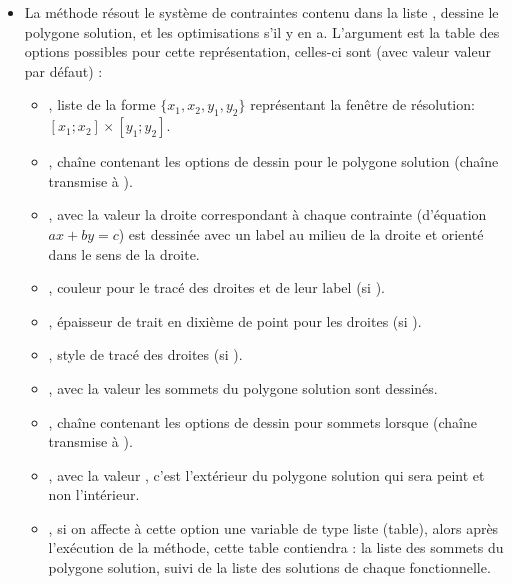 \begin{itemize}
    \item La méthode  résout le système de contraintes contenu dans la liste , dessine le polygone solution, et les optimisations s'il y en a. L'argument  est la table des options possibles pour cette représentation, celles-ci sont (avec valeur valeur par défaut) :
    \begin{itemize}
        \item {}, liste de la forme $\{x_1,x_2,y_1,y_2\}$ représentant la fenêtre de résolution: $[x_1;x_2]\times[y_1;y_2]$.
        
        \item {}, chaîne contenant les options de dessin pour le polygone solution (chaîne transmise à \drawcmd).
        
        \item {}, avec la valeur \true la droite correspondant à chaque contrainte (d'équation $ax+by=c$) est dessinée avec un label au milieu de la droite et orienté dans le sens de la droite.
        
        \item {}, couleur pour le tracé des droites et de leur label (si ).

        \item {}, épaisseur de trait en dixième de point pour les droites (si ).

        \item {}, style de tracé des droites (si ).
        
        \item {}, avec la valeur \true les sommets du polygone solution sont dessinés.
        
        \item {}, chaîne contenant les options de dessin pour sommets lorsque  (chaîne transmise à \drawcmd).
        
        \item {}, avec la valeur \true, c'est l'extérieur du polygone solution qui sera peint et non l'intérieur.
        
        \item {}, si on affecte à cette option  une variable de type liste (table), alors après l'exécution de la méthode, cette table contiendra : la liste des sommets du polygone solution, suivi de la liste des solutions de chaque fonctionnelle.
        

\end{itemize}
\end{itemize}
